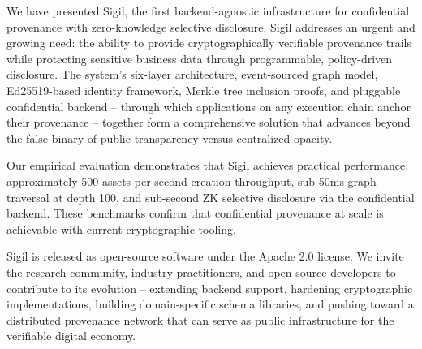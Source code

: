 \documentclass[conference]{IEEEtran}
\begin{document}
We have presented Sigil, the first backend-agnostic infrastructure for
confidential provenance with zero-knowledge selective disclosure.  Sigil
addresses an urgent and growing need: the ability to provide cryptographically
verifiable provenance trails while protecting sensitive business data through
programmable, policy-driven disclosure.  The system's six-layer architecture,
event-sourced graph model, Ed25519-based identity framework, Merkle tree
inclusion proofs, and pluggable confidential backend -- through which applications
on any execution chain anchor their provenance -- together form a
comprehensive solution that advances beyond the false binary of public
transparency versus centralized opacity.

Our empirical evaluation demonstrates that Sigil achieves practical
performance: approximately 500 assets per second creation throughput,
sub-50ms graph traversal at depth 100, and sub-second ZK selective disclosure
via the confidential backend.  These benchmarks confirm that confidential provenance at scale
is achievable with current cryptographic tooling.

Sigil is released as open-source software under the Apache 2.0 license.  We
invite the research community, industry practitioners, and open-source
developers to contribute to its evolution -- extending backend support,
hardening cryptographic implementations, building domain-specific schema
libraries, and pushing toward a distributed provenance network that can serve
as public infrastructure for the verifiable digital economy.

\end{document}
